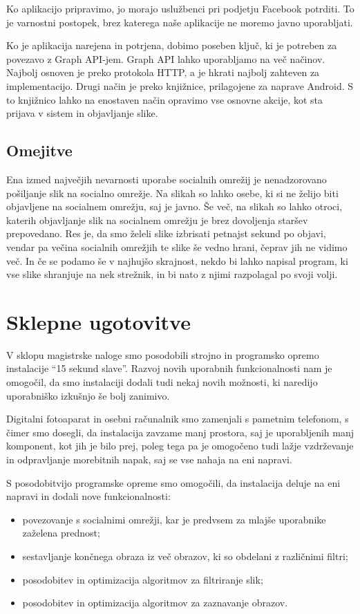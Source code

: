 \documentclass[a4paper, 12pt]{book}
\begin{document}
Ko aplikacijo pripravimo, jo morajo uslužbenci pri podjetju Facebook
potrditi. To je varnostni postopek, brez katerega naše aplikacije ne
moremo javno uporabljati.

Ko je aplikacija narejena in potrjena, dobimo poseben ključ, ki je potreben za
povezavo z Graph API-jem. Graph API lahko uporabljamo na več načinov.
Najbolj osnoven je preko protokola HTTP, a je hkrati najbolj zahteven za
implementacijo. Drugi način je preko knjižnice, prilagojene za naprave
Android. S to knjižnico lahko na enostaven način opravimo vse osnovne akcije,
kot sta prijava v sistem in objavljanje slike.


\section{Omejitve}
Ena izmed največjih nevarnosti uporabe socialnih omrežij je nenadzorovano
pošiljanje slik na socialno omrežje. Na slikah so lahko osebe, ki si ne želijo
biti objavljene na socialnem omrežju, saj je javno. Še več, na slikah so lahko
otroci, katerih objavljanje slik na socialnem omrežju je brez dovoljenja
staršev prepovedano. Res je, da smo želeli slike izbrisati petnajst sekund po
objavi, vendar pa večina socialnih omrežjih te slike še vedno hrani, čeprav
jih ne vidimo več. In če se podamo še v najhujšo skrajnost, nekdo bi lahko
napisal program, ki vse slike shranjuje na nek strežnik, in bi nato z njimi
razpolagal po svoji volji.


\chapter{Sklepne ugotovitve}
V sklopu magistrske naloge smo posodobili strojno in programsko opremo
instalacije ``15 sekund slave''. Razvoj novih uporabnih funkcionalnosti nam je
omogočil, da smo instalaciji dodali tudi nekaj novih možnosti, ki naredijo
uporabniško izkušnjo še bolj zanimivo.

Digitalni fotoaparat in osebni računalnik smo zamenjali s pametnim telefonom,
s čimer smo dosegli, da instalacija zavzame manj prostora, saj je uporabljenih
manj komponent, kot jih je bilo prej, poleg tega pa je omogočeno tudi lažje
vzdrževanje in odpravljanje morebitnih napak, saj se vse nahaja na eni
napravi.

S posodobitvijo programske opreme smo omogočili, da instalacija deluje na eni
napravi in dodali nove funkcionalnosti:
\begin{itemize}
    \item povezovanje s socialnimi omrežji, kar je predvsem za mlajše uporabnike zaželena prednost;
    \item sestavljanje končnega obraza iz več obrazov, ki so obdelani z različnimi filtri;
    \item posodobitev in optimizacija algoritmov za filtriranje slik;
    \item posodobitev in optimizacija algoritmov za zaznavanje obrazov.
\end{itemize}
\end{document}
